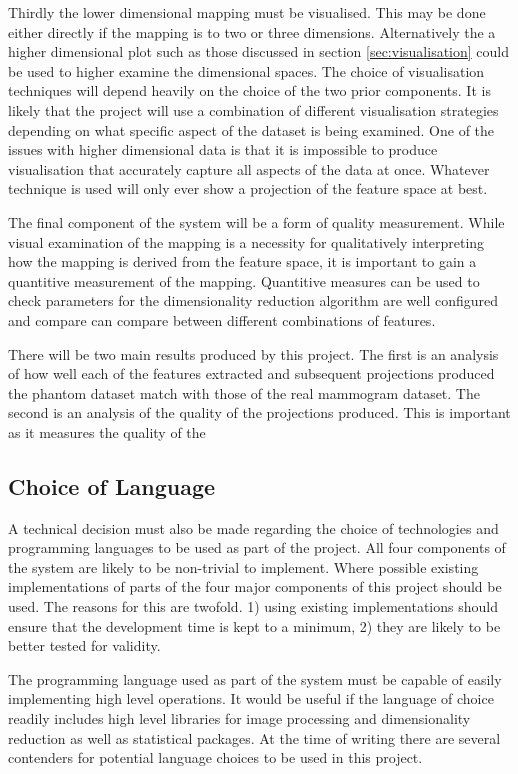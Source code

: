 Thirdly the lower dimensional mapping must be visualised. This may be done either directly if the mapping is to two or three dimensions. Alternatively the a higher dimensional plot such as those discussed in section \ref{sec:visualisation} could be used to higher examine the dimensional spaces. The choice of visualisation techniques will depend heavily on the choice of the two prior components. It is likely that the project will use a combination of different visualisation strategies depending on what specific aspect of the dataset is being examined. One of the issues with higher dimensional data is that it is impossible to produce visualisation that accurately capture all aspects of the data at once. Whatever technique is used will only ever show a projection of the feature space at best.

The final component of the system will be a form of quality measurement. While visual examination of the mapping is a necessity for qualitatively interpreting how the mapping is derived from the feature space, it is important to gain a quantitive measurement of the mapping. Quantitive measures can be used to check parameters for the dimensionality reduction algorithm are well configured and compare can compare between different combinations of features. 

There will be two main results produced by this project. The first is an analysis of how well each of the features extracted and subsequent projections produced the phantom dataset match with those of the real mammogram dataset. The second is an analysis of the quality of the projections produced. This is important as it measures the quality of the 

\subsection{Choice of Language}
\label{sec:choice-of-language}
A technical decision must also be made regarding the choice of technologies and programming languages to be used as part of the project. All four components of the system are likely to be non-trivial to implement. Where possible existing implementations of parts of the four major components of this project should be used. The reasons for this are twofold. 1) using existing implementations should ensure that the development time is kept to a minimum, 2) they are likely to be better tested for validity. 

The programming language used as part of the system must be capable of easily implementing high level operations. It would be useful if the language of choice readily includes high level libraries for image processing and dimensionality reduction as well as statistical packages. At the time of writing there are several contenders for potential language choices to be used in this project. 

